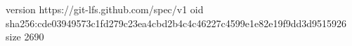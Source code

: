 version https://git-lfs.github.com/spec/v1
oid sha256:cde03949573c1fd279c23ea4cbd2b4c4c46227c4599e1e82e19f9dd3d9515926
size 2690
